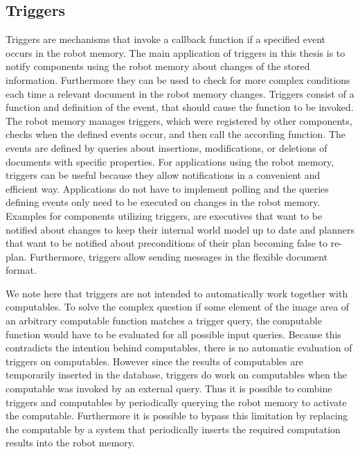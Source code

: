 \subsection{Triggers}
\label{sec:trigger}
Triggers are mechanisms that invoke a callback function if a specified
event occurs in the robot memory. The main application of triggers in
this thesis is to notify components using the robot memory about
changes of the stored information. Furthermore they can be used to
check for more complex conditions each time a relevant document in the
robot memory changes. Triggers consist of a function and definition of
the event, that should cause the function to be invoked. The robot
memory manages triggers, which were registered by other
components, checks when the defined events occur, and then call the according
function. The events are defined by queries about
insertions, modifications, or deletions of documents with specific
properties. For applications using the robot memory, triggers can be
useful because they allow notifications in a convenient and efficient
way. Applications do not have to implement polling and the queries
defining events only need to be executed on changes in the robot
memory. Examples for components utilizing
triggers, are executives that want to be notified about changes to
keep their internal world model up to date and planners that want to
be notified about preconditions of their plan becoming false to
re-plan. Furthermore, triggers allow sending messages in the flexible
document format.

We note here that triggers are not intended to automatically work
together with computables. To solve the complex question if
some element of the image area of an arbitrary computable function
matches a trigger query, the computable function would have to be
evaluated for all possible input queries. Because this contradicts the
intention behind computables, there is no automatic evaluation of
triggers on computables. However since the results of computables
are temporarily inserted in the database, triggers do work on computables
when the computable was invoked by an external query. Thus it is
possible to combine triggers and computables by periodically querying
the robot memory to activate the computable. Furthermore it is
possible to bypass this limitation by replacing the computable by a
system that periodically inserts the required computation results into
the robot memory.

